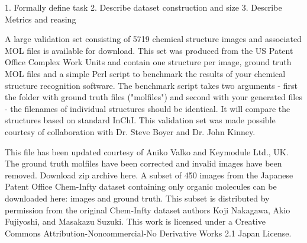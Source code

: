 \cite{Bajusz2015WhyIT}

1. Formally define task
2. Describe dataset construction and size
3. Describe Metrics and reasing 



A large validation set consisting of 5719 chemical structure images and associated MOL files is available for download. This set was produced from the US Patent Office Complex Work Units and contain one structure per image, ground truth MOL files and a simple Perl script to benchmark the results of your chemical structure recognition software. The benchmark script takes two arguments - first the folder with ground truth files ("molfiles") and second with your generated files - the filenames of individual structures should be identical. It will compare the structures based on standard InChI. This validation set was made possible courtesy of collaboration with Dr. Steve Boyer and Dr. John Kinney.

This file has been updated courtesy of Aniko Valko and Keymodule Ltd., UK. The ground truth molfiles have been corrected and invalid images have been removed.
Download zip archive here.
A subset of 450 images from the Japanese Patent Office Chem-Infty dataset containing only organic molecules can be downloaded here:
images and ground truth.
This subset is distributed by permission from the original Chem-Infty dataset authors Koji Nakagawa, Akio Fujiyoshi, and Masakazu Suzuki. This work is licensed under a Creative Commons Attribution-Noncommercial-No Derivative Works 2.1 Japan License.
